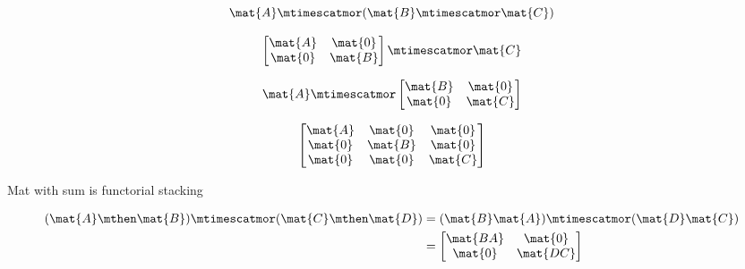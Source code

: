 \begin{forslides}
    \begin{equation}
        \label{eq:parallelism-052}
        \mat{A} \mtimescatmor ( \mat{B} \mtimescatmor \mat{C} )
    \end{equation}

    \begin{equation}
        \label{eq:parallelism-053}
        \begin{bmatrix}
        \mat{A} & \mat{0} \\
        \mat{0} & \mat{B}
        \end{bmatrix}
        \mtimescatmor \mat{C}
    \end{equation}

    \begin{equation}
        \label{eq:parallelism-054}
        \mat{A} \mtimescatmor 
        \begin{bmatrix}
        \mat{B} & \mat{0} \\
        \mat{0} & \mat{C}
        \end{bmatrix}
    \end{equation}

    \begin{equation}
        \label{eq:parallelism-055}
        \begin{bmatrix}
        \mat{A} & \mat{0} & \mat{0}  \\
        \mat{0} & \mat{B} & \mat{0} \\
        \mat{0} & \mat{0} & \mat{C}
        \end{bmatrix}
    \end{equation}

Mat with sum is functorial stacking

 
        \begin{align}\label{eq:parallelism-056}
        (\mat{A} \mthen \mat{B}) \mtimescatmor (\mat{C} \mthen \mat{D}) &=  (\mat{B}\mat{A}) \mtimescatmor (\mat{D}\mat{C})  \\
        & = 
        \begin{bmatrix}
        \mat{BA} & \mat{0} \\
        \mat{0} & \mat{DC}
        \end{bmatrix}
        \end{align}
        

\end{forslides}
